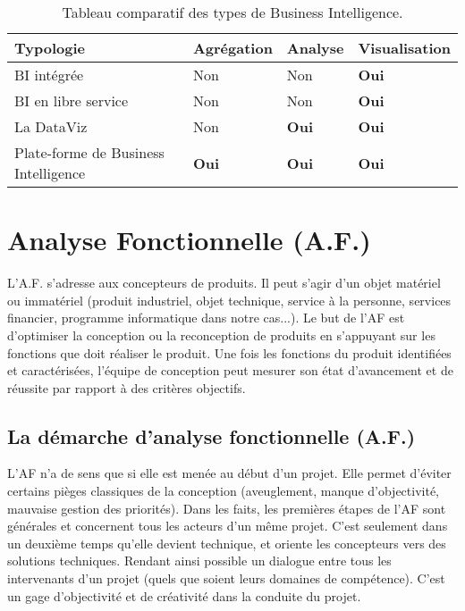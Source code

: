  \begin{table}[H]
     \centering
     \caption{Tableau comparatif des types de Business Intelligence.}
     \begin{tabular}[t]{|p{6cm}|p{3cm}|p{3cm}|p{3cm}|} 
         \hline
         \textbf{Typologie} & \textbf{Agrégation} & \textbf{Analyse} & \textbf{Visualisation} \\
         \hline\hline
         BI intégrée & Non & Non & \textbf{Oui} \\
         \hline
         BI en libre service & Non & Non & \textbf{Oui} \\
         \hline
         La DataViz & Non & \textbf{Oui} & \textbf{Oui} \\
         \hline
         Plate-forme de Business Intelligence & \textbf{Oui} & \textbf{Oui} & \textbf{Oui} \\
         \hline\hline
     \end{tabular}
     \label{tab:comparatiftypebi}
 \end{table}%
 
 
 
\section{Analyse Fonctionnelle (A.F.)}
L’A.F. s’adresse aux concepteurs de produits. Il peut s’agir d’un objet matériel ou immatériel (produit industriel, objet technique, service à la personne, services financier, programme informatique dans notre cas...). Le but de l’AF est d’optimiser la conception ou la reconception de produits en s’appuyant sur les fonctions que doit réaliser le produit. Une fois les fonctions du produit identifiées et caractérisées, l’équipe de conception peut mesurer son état d’avancement et de réussite par rapport à des critères objectifs.

\subsection{La démarche d’analyse fonctionnelle (A.F.)}
L’AF n’a de sens que si elle est menée au début d’un projet. Elle permet d’éviter certains pièges classiques de la conception (aveuglement, manque d’objectivité, mauvaise gestion des priorités). Dans les faits, les premières étapes de l’AF sont générales et concernent tous les acteurs d’un même projet. C’est seulement dans un deuxième temps qu'elle devient technique, et oriente les concepteurs vers des solutions techniques. Rendant ainsi possible un dialogue entre tous les intervenants d’un projet (quels que soient leurs domaines de compétence). C’est un gage d’objectivité et de créativité dans la conduite du projet.

